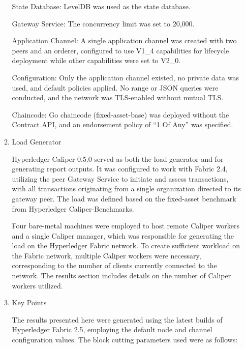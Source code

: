 \documentclass[conference]{IEEEtran}
\begin{document}
\begin{enumerate}[itemsep=2ex, parsep=1ex]
\begin{enumerate}[itemsep=2ex, parsep=1ex]
	      	      State Database: LevelDB was used as the state database.
	      	      	      	      
	      	      Gateway Service: The concurrency limit was set to 20,000.
	      	      	      	      
	      	      Application Channel: A single application channel was created with two
	      	      peers and an orderer, configured to use V1\_4 capabilities for lifecycle
	      	      deployment while other capabilities were set to V2\_0.
	      	      	      	      
	      	      Configuration: Only the application channel existed, no private data
	      	      was used, and default policies applied. No range or JSON queries were
	      	      conducted, and the network was TLS-enabled without mutual TLS.
	      	      	      	      
	      	      Chaincode: Go chaincode (fixed-asset-base) was deployed without the
	      	      Contract API, and an endorsement policy of “1 Of Any” was specified.
	      	      	      	      
	      	\item Load Generator
	      	      	      	      
	      	      Hyperledger Caliper 0.5.0 served as both the load generator and for generating
	      	      report outputs. It was configured to work with Fabric 2.4, utilizing the
	      	      peer Gateway Service to initiate and assess transactions, with all
	      	      transactions originating from a single organization directed to its
	      	      gateway peer. The load was defined based on the fixed-asset benchmark from
	      	      Hyperledger Caliper-Benchmarks.
	      	      	      	      
	      	      Four bare-metal machines were employed to host remote Caliper workers and
	      	      a single Caliper manager, which was responsible for generating the
	      	      load on the Hyperledger Fabric network. To create sufficient workload on
	      	      the Fabric network, multiple Caliper workers were necessary, corresponding
	      	      to the number of clients currently connected to the network. The
	      	      results section includes details on the number of Caliper workers
	      	      utilized.
	      	      	      	      
	      	\item Key Points
	      	      	      	      
	      	      The results presented here were generated using the latest builds of
	      	      Hyperledger Fabric 2.5, employing the default node and channel configuration
	      	      values. The block cutting parameters used were as follows:
	      	      	      	      

\end{enumerate}
\end{enumerate}
\end{document}
